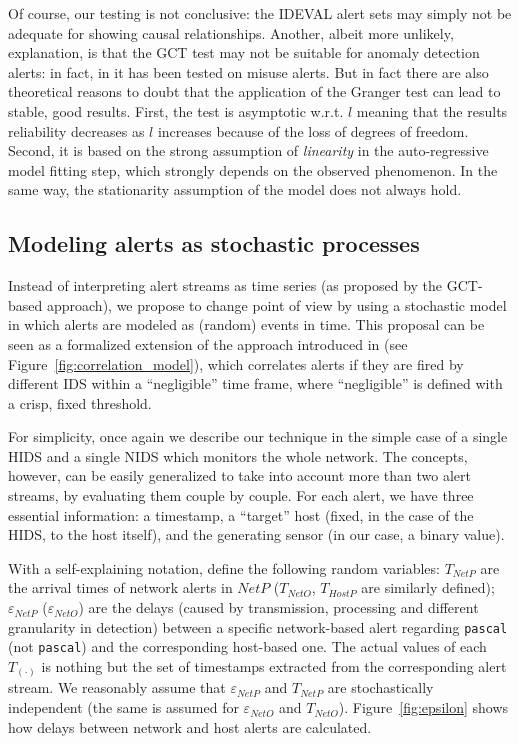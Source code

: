 Of course, our testing is not conclusive: the \ac{IDEVAL} alert sets may simply not be adequate for showing causal relationships. Another, albeit more unlikely, explanation, is that the \ac{GCT} test may not be suitable for anomaly detection alerts: in fact, in \citep{dblp:conf/raid/qinl03} it has been tested on misuse alerts. But in fact there are also theoretical reasons to doubt that the application of the Granger test can lead to stable, good results. First, the test is asymptotic w.r.t. $l$ meaning that the results reliability decreases as $l$ increases because of the loss of degrees of freedom. Second, it is based on the strong assumption of \emph{linearity} in the auto-regressive model fitting step, which strongly depends on the observed phenomenon. In the same way, the stationarity assumption of the model does not always hold.

\subsection{Modeling alerts as stochastic processes}
\label{correlation:causality:count-proc-model}
Instead of interpreting alert streams as time series (as proposed by
the \ac{GCT}-based approach), we propose to change point of
view by using a stochastic model in which alerts are modeled as
(random) events in time. This proposal can be seen as a formalized
extension of the approach introduced in \citep{valeur04comprehensive}
(see Figure~\ref{fig:correlation_model}), which correlates alerts if
they are fired by different \ac{IDS} within a
``negligible'' time frame, where ``negligible'' is defined with a
crisp, fixed threshold.

For simplicity, once again we describe our technique in the simple case of a single \ac{HIDS} and a single \ac{NIDS} which monitors the whole network. The concepts, however, can be easily generalized to take into account more than two alert streams, by evaluating them couple by couple. For each alert, we have three essential information: a timestamp, a ``target'' host (fixed, in the case of the \ac{HIDS}, to the host itself), and the generating sensor (in our case, a binary value).

With a self-explaining notation, define the following random variables: $T_{NetP}$ are the arrival times of network alerts in $NetP$ ($T_{NetO}$, $T_{HostP}$ are similarly defined); $\varepsilon_{NetP}$ ($\varepsilon_{NetO}$) are the delays (caused by transmission, processing and different granularity in detection) between a specific network-based alert regarding \texttt{pascal} (not \texttt{pascal}) and the corresponding host-based one. The actual values of each $T_{(\cdot)}$ is nothing but the set of timestamps extracted from the corresponding alert stream. We reasonably assume that $\varepsilon_{NetP}$ and $T_{NetP}$ are stochastically independent (the same is assumed for $\varepsilon_{NetO}$ and $T_{NetO}$). Figure~\ref{fig:epsilon} shows how delays between network and host alerts are calculated.

